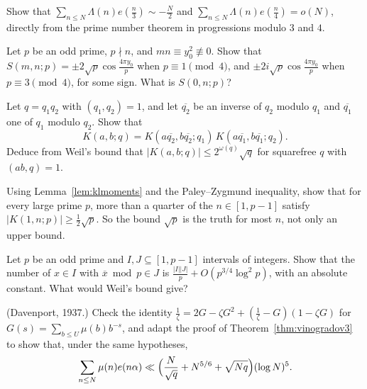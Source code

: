 \begin{exercise}[$\star$]\label{ex:sthird}
Show that $\sum_{n\le N}\Lambda(n)e(\frac n3)\sim-\frac N2$ and $\sum_{n\le N}\Lambda(n)e(\frac n4)=o(N)$, directly from the prime number theorem in progressions modulo $3$ and $4$.
\end{exercise}

\begin{exercise}[$\star$]\label{ex:salie}
Let $p$ be an odd prime, $p\nmid n$, and $mn\equiv y_0^2\not\equiv0$. Show that $S(m,n;p)=\pm2\sqrt p\cos\frac{4\pi y_0}p$ when $p\equiv1\pmod4$, and $\pm2i\sqrt p\cos\frac{4\pi y_0}p$ when $p\equiv3\pmod4$, for some sign. What is $S(0,n;p)$?
\end{exercise}

\begin{exercise}[$\star\star$]\label{ex:twisted}
Let $q=q_1q_2$ with $(q_1,q_2)=1$, and let $\overline{q_2}$ be an inverse of $q_2$ modulo $q_1$ and $\overline{q_1}$ one of $q_1$ modulo $q_2$. Show that
\[
K(a,b;q)=K(a\overline{q_2},b\overline{q_2};q_1)\,K(a\overline{q_1},b\overline{q_1};q_2).
\]
Deduce from Weil's bound that $|K(a,b;q)|\le2^{\omega(q)}\sqrt q$ for squarefree $q$ with $(ab,q)=1$.
\end{exercise}

\begin{exercise}[$\star\star$]\label{ex:klpz}
Using Lemma~\ref{lem:klmoments} and the Paley--Zygmund inequality, show that for every large prime $p$, more than a quarter of the $n\in[1,p-1]$ satisfy $|K(1,n;p)|\ge\frac12\sqrt p$. So the bound $\sqrt p$ is the truth for most $n$, not only an upper bound.
\end{exercise}

\begin{exercise}[$\star\star$]\label{ex:inverses}
Let $p$ be an odd prime and $I,J\subseteq[1,p-1]$ intervals of integers. Show that the number of $x\in I$ with $\overline x\bmod p\in J$ is $\frac{|I||J|}p+O(p^{3/4}\log^2p)$, with an absolute constant. What would Weil's bound give?
\end{exercise}

\begin{exercise}[$\star\star\star$]\label{ex:mobiussum}
(Davenport, 1937.) Check the identity $\frac1\zeta=2G-\zeta G^2+(\frac1\zeta-G)(1-\zeta G)$ for $G(s)=\sum_{b\le U}\mu(b)b^{-s}$, and adapt the proof of Theorem~\ref{thm:vinogradov3} to show that, under the same hypotheses,
\[
\sum_{n\le N}\mu(n)e(n\alpha)\ll\Bigl(\frac N{\sqrt q}+N^{5/6}+\sqrt{Nq}\Bigr)(\log N)^5.
\]
\end{exercise}


